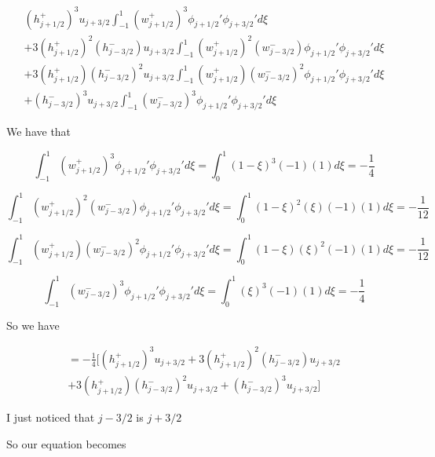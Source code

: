 \documentclass[12pt]{article}
\begin{document}
\begin{multline}
 \left(h^+_{j+ 1/2}\right)^3u_{j+3/2} \int_{-1}^{1} \left(w^+_{j +1/2}\right)^3\phi_{j+1/2}'\phi_{j+3/2}' d\xi\\ + 3\left(h^+_{j+ 1/2}\right)^2\left(h^-_{j- 3/2}\right)u_{j+3/2} \int_{-1}^{1} \left(w^+_{j + 1/2}\right)^2\left(w^-_{j - 3/2}\right)\phi_{j+1/2}'\phi_{j+3/2}'d\xi \\ + 3\left(h^+_{j+ 1/2}\right) \left(h^-_{j- 3/2}\right)^2u_{j+3/2} \int_{-1}^{1}\left(w^+_{j + 1/2}\right) \left(w^-_{j - 3/2}\right)^2\phi_{j+1/2}'\phi_{j+3/2}'d\xi\\ +\left(h^-_{j- 3/2}\right)^3  u_{j+3/2} \int_{-1}^{1}\left(w^-_{j - 3/2}\right)^3  \phi_{j+1/2}'\phi_{j+3/2}' d\xi
\end{multline}

 We have that
 
 \[\int_{-1}^{1} \left(w^+_{j +1/2}\right)^3\phi_{j+1/2}'\phi_{j+3/2}' d\xi = \int_{0}^{1} \left(1 - \xi \right)^3\left(-1\right)(1) d\xi = -\frac{1}{4}\]
 
 \[\int_{-1}^{1} \left(w^+_{j + 1/2}\right)^2\left(w^-_{j - 3/2}\right)\phi_{j+1/2}'\phi_{j+3/2}' d\xi = \int_{0}^{1} \left(1 - \xi\right)^2\left(\xi\right)\left(-1\right)(1) d\xi = -\frac{1}{12}\]
 
 \[\int_{-1}^{1}\left(w^+_{j + 1/2}\right) \left(w^-_{j - 3/2}\right)^2\phi_{j+1/2}'\phi_{j+3/2}' d\xi=\int_{0}^{1}\left(1 - \xi\right) \left(\xi\right)^2\left(-1\right)(1) d\xi= -\frac{1}{12}\]
 
 \[\int_{-1}^{1}\left(w^-_{j - 3/2}\right)^3  \phi_{j+1/2}'\phi_{j+3/2}' d\xi = \int_{0}^{1}\left(\xi\right)^3  \left(-1\right)(1)  d\xi= -\frac{1}{4}\]
 
 So we have
 
 \begin{multline}
  = -\frac{1}{4} \bigg[\left(h^+_{j+ 1/2}\right)^3u_{j+3/2} + 3\left(h^+_{j+ 1/2}\right)^2\left(h^-_{j- 3/2}\right)u_{j+3/2} \\ + 3\left(h^+_{j+ 1/2}\right) \left(h^-_{j- 3/2}\right)^2u_{j+3/2}  +\left(h^-_{j- 3/2}\right)^3  u_{j+3/2}  \bigg]
 \end{multline}
 
 I just noticed that $j - 3/2$ is $j + 3/2$
 
 So our equation becomes
 
\end{document}

